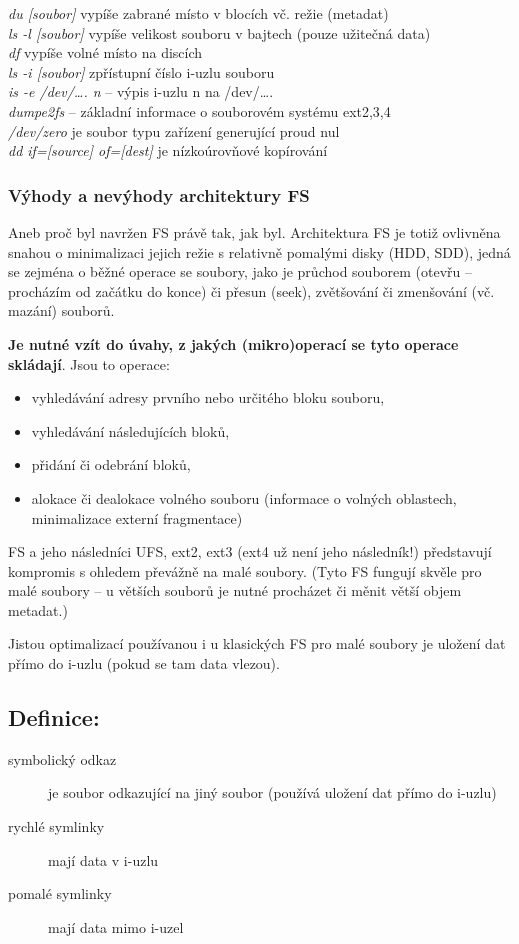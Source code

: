 \documentclass[a4paper, 11pt]{article}
\begin{document}
\textit{du [soubor]} vypíše zabrané místo v blocích vč. režie (metadat) \\[0.2em]
\textit{ls -l [soubor]} vypíše velikost souboru v bajtech (pouze užitečná data) \\[0.2em]
\textit{df} vypíše volné místo na discích \\[0.2em]
\textit{ls -i [soubor]} zpřístupní číslo i-uzlu souboru \\[0.2em]
\textit{is -e /dev/\ldots. n} -- výpis i-uzlu n na /dev/\ldots. \\[0.2em]
\textit{dumpe2fs} -- základní informace o souborovém systému ext2,3,4 \\[0.2em]
\textit{/dev/zero} je soubor typu zařízení generující proud nul \\[0.2em]
\textit{dd if=[source] of=[dest]} je nízkoúrovňové kopírování
 
\subsubsection{Výhody a nevýhody architektury FS}
Aneb proč byl navržen FS právě tak, jak byl. Architektura FS je totiž ovlivněna snahou o minimalizaci jejich režie s relativně pomalými disky (HDD, SDD), jedná se zejména o běžné operace se soubory, jako je průchod souborem (otevřu -- procházím od začátku do konce) či přesun (seek), zvětšování či zmenšování (vč. mazání) souborů.

\textbf{Je nutné vzít do úvahy, z jakých (mikro)operací se tyto operace skládají}. Jsou to operace:
\begin{itemize}
 \item vyhledávání adresy prvního nebo určitého bloku souboru,
 \item vyhledávání následujících bloků,
 \item přidání či odebrání bloků,
 \item alokace či dealokace volného souboru (informace o volných oblastech, minimalizace externí fragmentace)
\end{itemize}

FS a jeho následníci UFS, ext2, ext3 (ext4 už není jeho následník!) představují kompromis s ohledem převážně na malé soubory. (Tyto FS fungují skvěle pro malé soubory -- u větších souborů je nutné procházet či měnit větší objem metadat.)

Jistou optimalizací používanou i u klasických FS pro malé soubory je uložení dat přímo do i-uzlu (pokud se tam data vlezou).

\subsection*{Definice:}
\begin{description}
\item[symbolický odkaz] je soubor odkazující na jiný soubor (používá uložení dat přímo do i-uzlu)
\item[rychlé symlinky] mají data v i-uzlu
\item[pomalé symlinky] mají data mimo i-uzel
\end{description}
\end{document}

